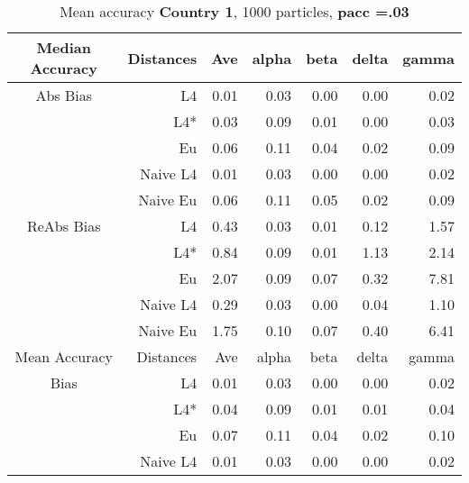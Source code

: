 \documentclass[a4paper,12pt,twoside]{book}
\begin{document}
\begin{table}[H]

\centering
\vfill
\vspace{2cm}
\caption{Mean  accuracy \textbf{Country 1}, 1000 particles, \textbf{pacc =.03}}


\begin{tabular}{crrrrrr}

  \hline
  
{\color{blue}Median Accuracy} & Distances & Ave & alpha & beta & delta & gamma \\ 
  \hline
{\color{blue}Abs Bias} & L4  &0.01 & 0.03 & 0.00 & 0.00 & 0.02 \\ 
  
&L4*  &0.03 & 0.09 & 0.01 & 0.00 & 0.03 \\ 
  
&Eu &  0.06 & 0.11 & 0.04 & 0.02 & 0.09 \\ 
  
&Naive L4&       0.01 & 0.03 & 0.00 & 0.00 & 0.02 \\ 
  
&Naive Eu & 0.06 & 0.11 & 0.05 & 0.02 & 0.09 \\ 
 
   \hline
   
{\color{blue} ReAbs Bias } & L4  &0.43 & 0.03 & 0.01 & 0.12 & 1.57 \\ 
  
&L4*  &0.84 & 0.09 & 0.01 & 1.13 & 2.14 \\ 
  
&Eu &   
  2.07 & 0.09 & 0.07 & 0.32 & 7.81 \\ 
 
&Naive L4&   
 0.29 & 0.03 & 0.00 & 0.04 & 1.10 \\ 
  
&Naive Eu &   1.75 & 0.10 & 0.07 & 0.40 & 6.41 \\ 
  
   \hline
{\color{blue}Mean Accuracy} & Distances & Ave & alpha & beta & delta & gamma \\ 
  \hline
{\color{blue}Bias} & L4  &0.01 & 0.03 & 0.00 & 0.00 & 0.02 \\ 
  
&L4*  &  0.04 & 0.09 & 0.01 & 0.01 & 0.04 \\ 
  
  
&Eu &   0.07 & 0.11 & 0.04 & 0.02 & 0.10 \\ 
  
  
&Naive L4&  
0.01 & 0.03 & 0.00 & 0.00 & 0.02 \\
   

\end{tabular}
\end{table}
\end{document}
